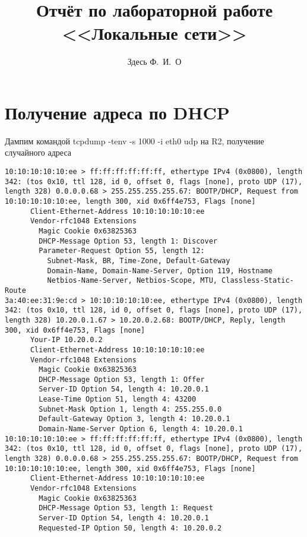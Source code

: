 \documentclass[a4paper,12pt]{article}
\title{Отчёт по лабораторной работе \\ <<Локальные сети>>}
\author{Здесь Ф.~И.~О}
\begin{document}
\maketitle

\tableofcontents


\section{Получение адреса по DHCP}

Дампим командой tcpdump -tenv -s 1000 -i eth0 udp на R2, получение случайного адреса

\begin{Verbatim}
10:10:10:10:10:ee > ff:ff:ff:ff:ff:ff, ethertype IPv4 (0x0800), length 342: (tos 0x10, ttl 128, id 0, offset 0, flags [none], proto UDP (17), length 328) 0.0.0.0.68 > 255.255.255.255.67: BOOTP/DHCP, Request from 10:10:10:10:10:ee, length 300, xid 0x6ff4e753, Flags [none]
	  Client-Ethernet-Address 10:10:10:10:10:ee
	  Vendor-rfc1048 Extensions
	    Magic Cookie 0x63825363
	    DHCP-Message Option 53, length 1: Discover
	    Parameter-Request Option 55, length 12: 
	      Subnet-Mask, BR, Time-Zone, Default-Gateway
	      Domain-Name, Domain-Name-Server, Option 119, Hostname
	      Netbios-Name-Server, Netbios-Scope, MTU, Classless-Static-Route
3a:40:ee:31:9e:cd > 10:10:10:10:10:ee, ethertype IPv4 (0x0800), length 342: (tos 0x10, ttl 128, id 0, offset 0, flags [none], proto UDP (17), length 328) 10.20.0.1.67 > 10.20.0.2.68: BOOTP/DHCP, Reply, length 300, xid 0x6ff4e753, Flags [none]
	  Your-IP 10.20.0.2
	  Client-Ethernet-Address 10:10:10:10:10:ee
	  Vendor-rfc1048 Extensions
	    Magic Cookie 0x63825363
	    DHCP-Message Option 53, length 1: Offer
	    Server-ID Option 54, length 4: 10.20.0.1
	    Lease-Time Option 51, length 4: 43200
	    Subnet-Mask Option 1, length 4: 255.255.0.0
	    Default-Gateway Option 3, length 4: 10.20.0.1
	    Domain-Name-Server Option 6, length 4: 10.20.0.1
10:10:10:10:10:ee > ff:ff:ff:ff:ff:ff, ethertype IPv4 (0x0800), length 342: (tos 0x10, ttl 128, id 0, offset 0, flags [none], proto UDP (17), length 328) 0.0.0.0.68 > 255.255.255.255.67: BOOTP/DHCP, Request from 10:10:10:10:10:ee, length 300, xid 0x6ff4e753, Flags [none]
	  Client-Ethernet-Address 10:10:10:10:10:ee
	  Vendor-rfc1048 Extensions
	    Magic Cookie 0x63825363
	    DHCP-Message Option 53, length 1: Request
	    Server-ID Option 54, length 4: 10.20.0.1
	    Requested-IP Option 50, length 4: 10.20.0.2

\end{Verbatim}
\end{document}
